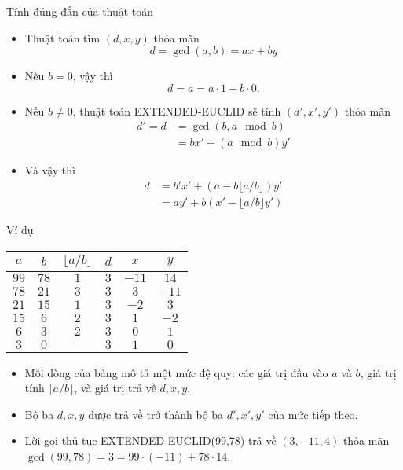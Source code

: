\begin{frame}{Tính đúng đắn của thuật toán}
  \begin{itemize}
  \item Thuật toán tìm $(d,x,y)$ thỏa mãn 
    $$
    d = \gcd(a,b) = ax + by
    $$
  \item Nếu $b = 0$, vậy thì 
    $$
    d = a = a\cdot 1 + b\cdot 0.
    $$
  \item Nếu $b \not= 0$, thuật toán EXTENDED-EUCLID sẽ tính $(d', x',y')$ thỏa mãn 
    \begin{align*}
      d'=d &= \gcd (b, a \mod b)\\
           &= b x' + (a \mod b)y'
    \end{align*}
  \item Và vậy thì 
    \begin{align*}
      d &=  b'x' + (a - b \lfloor a/b\rfloor) y' \\
        &= a y' + b (x' - \lfloor a/b \rfloor y')
    \end{align*}
  \end{itemize}
\end{frame}

\begin{frame}{Ví dụ}
  \begin{block}{}
      \begin{table}
        \centering
      \begin{tabular}{cccccc}
        $a$ &$b$ &$\lfloor a/b \rfloor$& $d$& $x$& $y$\\
        \hline 
        $99$ &$78$ &$1$ &$3$ &$-11$ &$14$ \\
        $78$ &$21$ &$3$ &$3$ &$3$ &$-11$ \\
         $21$ &$15$ &$1$ &$3$ &$-2$ &$3$ \\
        $15$ &$6$ &$2$ &$3$ &$1$ &$-2$ \\
        $6$ &$3$ &$2$ &$3$ &$0$ &$1$ \\
        $3$ &$0$ &$-$ &$3$ &$1$ &$0$ \\
        \hline 
      \end{tabular}
    \end{table}
\vspace{-0.5cm}
 
  \end{block}
  \begin{itemize}
  \item Mỗi dòng  của bảng mô tả một mức đệ quy: các giá trị đầu vào $a$ và $b$, giá trị tính $\lfloor a/b \rfloor $, và giá trị trả về  $d , x, y$. 
  \item Bộ ba $d, x, y$ được trả về trở thành bộ ba $d', x',y'$ của mức tiếp theo. 
  \item Lời gọi  thủ tục EXTENDED-EUCLID(99,78) trả về $(3,-11,4)$ thỏa mãn $\gcd(99,78) = 3 = 99 \cdot (-11) + 78\cdot 14$.
  \end{itemize}
\end{frame}

